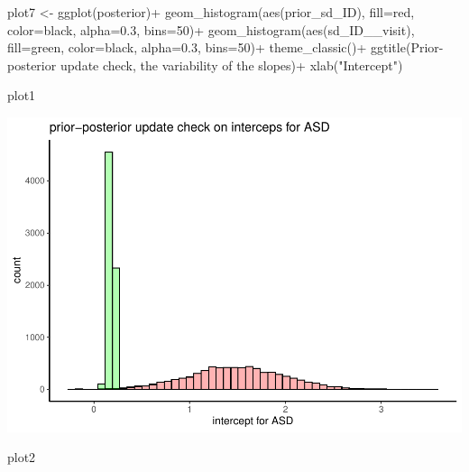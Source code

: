 \documentclass[
]{article}
\newenvironment{Shaded}{\begin{snugshade}}{\end{snugshade}}
\newcommand{\AttributeTok}[1]{\textcolor[rgb]{0.77,0.63,0.00}{#1}}
\newcommand{\DecValTok}[1]{\textcolor[rgb]{0.00,0.00,0.81}{#1}}
\newcommand{\FloatTok}[1]{\textcolor[rgb]{0.00,0.00,0.81}{#1}}
\newcommand{\FunctionTok}[1]{\textcolor[rgb]{0.00,0.00,0.00}{#1}}
\newcommand{\NormalTok}[1]{#1}
\newcommand{\OtherTok}[1]{\textcolor[rgb]{0.56,0.35,0.01}{#1}}
\newcommand{\SpecialCharTok}[1]{\textcolor[rgb]{0.00,0.00,0.00}{#1}}
\newcommand{\StringTok}[1]{\textcolor[rgb]{0.31,0.60,0.02}{#1}}
\begin{document}
\begin{Shaded}
\begin{Highlighting}[]
\NormalTok{plot7 }\OtherTok{\textless{}{-}} \FunctionTok{ggplot}\NormalTok{(posterior)}\SpecialCharTok{+}
  \FunctionTok{geom\_histogram}\NormalTok{(}\FunctionTok{aes}\NormalTok{(prior\_sd\_ID), }\AttributeTok{fill=}\StringTok{\textquotesingle{}red\textquotesingle{}}\NormalTok{, }\AttributeTok{color=}\StringTok{\textquotesingle{}black\textquotesingle{}}\NormalTok{, }\AttributeTok{alpha=}\FloatTok{0.3}\NormalTok{, }\AttributeTok{bins=}\DecValTok{50}\NormalTok{)}\SpecialCharTok{+}
  \FunctionTok{geom\_histogram}\NormalTok{(}\FunctionTok{aes}\NormalTok{(sd\_ID\_\_visit), }\AttributeTok{fill=}\StringTok{\textquotesingle{}green\textquotesingle{}}\NormalTok{, }\AttributeTok{color=}\StringTok{\textquotesingle{}black\textquotesingle{}}\NormalTok{, }\AttributeTok{alpha=}\FloatTok{0.3}\NormalTok{, }\AttributeTok{bins=}\DecValTok{50}\NormalTok{)}\SpecialCharTok{+}
  \FunctionTok{theme\_classic}\NormalTok{()}\SpecialCharTok{+}
  \FunctionTok{ggtitle}\NormalTok{(}\StringTok{\textquotesingle{}Prior{-}posterior update check, the variability of the slopes\textquotesingle{}}\NormalTok{)}\SpecialCharTok{+}
  \FunctionTok{xlab}\NormalTok{(}\StringTok{"Intercept"}\NormalTok{)}


\NormalTok{plot1}
\end{Highlighting}
\end{Shaded}

\includegraphics{assignment_1_final_files/figure-latex/unnamed-chunk-14-1.pdf}

\begin{Shaded}
\begin{Highlighting}[]
\NormalTok{plot2}
\end{Highlighting}
\end{Shaded}
\end{document}
